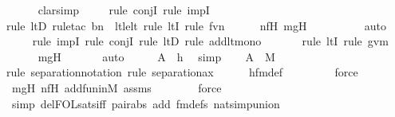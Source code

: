 \begin{isabellebody}
\ \ \ \ \isamarkupfalse%
\ clarsimp\isanewline
\ \ \ \ \isamarkupfalse%
{\isacharparenleft}{\kern0pt}rule\ conjI{\isacharcomma}{\kern0pt}\ rule\ impI{\isacharparenright}{\kern0pt}\isanewline
\ \ \ \ \ \isamarkupfalse%
{\isacharparenleft}{\kern0pt}rule\ ltD{\isacharcomma}{\kern0pt}\ rule{\isacharunderscore}{\kern0pt}tac\ b{\isacharequal}{\kern0pt}n\ \ lt{\isacharunderscore}{\kern0pt}le{\isacharunderscore}{\kern0pt}lt{\isacharcomma}{\kern0pt}\ rule\ ltI{\isacharcomma}{\kern0pt}\ rule\ fvn{\isacharparenright}{\kern0pt}\isanewline
\ \ \ \ \isamarkupfalse%
\ nfH\ mgH\ \isanewline
\ \ \ \ \ \ \ \isamarkupfalse%
\ auto{\isacharbrackleft}{\kern0pt}{}{\isacharbrackright}{\kern0pt}\isanewline
\ \ \ \ \isamarkupfalse%
{\isacharparenleft}{\kern0pt}rule\ impI{\isacharcomma}{\kern0pt}\ rule\ conjI{\isacharcomma}{\kern0pt}\ rule\ ltD{\isacharcomma}{\kern0pt}\ rule\ add{\isacharunderscore}{\kern0pt}lt{\isacharunderscore}{\kern0pt}mono{}{\isacharparenright}{\kern0pt}\isanewline
\ \ \ \ \ \ \isamarkupfalse%
{\isacharparenleft}{\kern0pt}rule\ ltI{\isacharcomma}{\kern0pt}\ rule\ gvm{\isacharparenright}{\kern0pt}\isanewline
\ \ \ \ \isamarkupfalse%
\ mgH\ \isanewline
\ \ \ \ \isamarkupfalse%
\ auto\isanewline
\isanewline
\ \ \isamarkupfalse%
\ \isamarkupfalse%
\ {\isachardoublequoteopen}{\isacharquery}{\kern0pt}A\ {\isacharequal}{\kern0pt}\ h{\isachardoublequoteclose}\ \isamarkupfalse%
\ simp\isanewline
\isanewline
\ \ \isamarkupfalse%
\ {\isachardoublequoteopen}{\isacharquery}{\kern0pt}A\ {\isasymin}\ M{\isachardoublequoteclose}\ \isanewline
\ \ \ \ \isamarkupfalse%
{\isacharparenleft}{\kern0pt}rule\ separation{\isacharunderscore}{\kern0pt}notation{\isacharcomma}{\kern0pt}\ rule\ separation{\isacharunderscore}{\kern0pt}ax{\isacharparenright}{\kern0pt}\isanewline
\ \ \ \ \isamarkupfalse%
\ hfm{\isacharunderscore}{\kern0pt}def\isanewline
\ \ \ \ \ \ \ \isamarkupfalse%
\ force\isanewline
\ \ \ \ \isamarkupfalse%
\ mgH\ nfH\ add{\isacharunderscore}{\kern0pt}fun{\isacharunderscore}{\kern0pt}in{\isacharunderscore}{\kern0pt}M\ assms\isanewline
\ \ \ \ \ \ \isamarkupfalse%
\ force\ \isanewline
\ \ \ \ \ \isamarkupfalse%
\ {\isacharparenleft}{\kern0pt}simp\ del{\isacharcolon}{\kern0pt}FOL{\isacharunderscore}{\kern0pt}sats{\isacharunderscore}{\kern0pt}iff\ pair{\isacharunderscore}{\kern0pt}abs\ add{\isacharcolon}{\kern0pt}\ fm{\isacharunderscore}{\kern0pt}defs\ nat{\isacharunderscore}{\kern0pt}simp{\isacharunderscore}{\kern0pt}union{\isacharparenright}{\kern0pt}\isanewline

\end{isabellebody}
